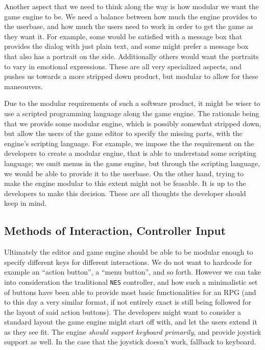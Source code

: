 Another aspect that we need to think along the way is how modular we want
the game engine to be. We need a balance between how much the engine provides
to the userbase, and how much the users need to work in order to get the game
as they want it. For example, some would be satisfied with a message box that
provides the dialog with just plain text, and some might prefer a message box
that also has a portrait on the side. Additionally others would want the
portraits to vary in emotional expressions. These are all very specialized
aspects, and pushes us towards a more stripped down product, but modular to
allow for these maneouvers.

Due to the modular requirements of such a software product, it might be wiser to
use a scripted programming language along the game engine. The rationale being
that we provide some modular engine, which is possibly somewhat stripped down,
but allow the users of the game editor to specify the missing parts, with the
engine's scripting language. For example, we impose the the requirement on the
developers to create a modular engine, that is able to understand some scripting
language; we omit menus in the game engine, but through the scripting language,
we would be able to provide it to the userbase. On the other hand, trying to
make the engine modular to this extent might not be feasable. It is up to the
developers to make this decision. These are all thoughts the developer should
keep in mind.

\subsection{Methods of Interaction, Controller Input}

Ultimately the editor and game engine should be able to be modular enough to
specify different keys for different interactions. We do not want to hardcode
for example an ``action button'', a ``menu button'', and so forth. However we
can take into consideration the traditional \texttt{NES} controller, and how
such a minimalistic set of buttons have been able to provide most basic
functionalities for an RPG (and to this day a very similar format, if not
entirely exact is still being followed for the layout of said action buttons).
The developers might want to consider a standard layout the game engine might
start off with, and let the users extend it as they see fit. The engine
\textit{should support keyboard primarily}, and provide joystick support as
well. In the case that the joystick doesn't work, fallback to keyboard.

